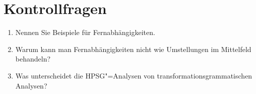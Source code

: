 \begin{comment}
Strukturen sind kohärent und vollständig, es gibt also nichts, was die unerwünschte Analyse in
(\mex{0}c) ausschließt. Die Konsequenz ist, daß man für die Konstituenten im Mittelfeld eine andere
\fstr"=Annotation braucht als für die im Vorfeld: Objekte im Vorfeld können zum obersten Verb(alkomplex) oder
aber zu tiefer eingebetteten Verben gehören, Objekte im Mittelfeld dagegen nur zu den Verben
im entsprechenden Kohärenzfeld (siehe Kapitel~\ref{chap-anhebung}). Das heißt aber, daß man an zwei verschiedenen
Stellen in der Grammatik sagen muß, daß (bestimmte) Nominative \subj sind, daß (bestimmte)
Akkusative \obj sind usw. 
%
%
Im Gegensatz zu der hier beschriebenen Theorie im Rahmen der LFG gibt es
in der HPSG keine grammatischen Funktionen. Eine Nominalphrase kann als Argument, als Adjunkt oder
prädikativ auf"|treten. Welche Funktion vorliegt, wird durch den Lexikoneintrag des Nomens
bestimmt. Fernabhängigkeiten interagieren mit der Funktion nicht, da die Vorfeldkonstituente mit einer
Spur identifiziert wird und somit alle relevante Information in beiden Teilstrukturen präsent ist:
Befindet sich im Vorfeld eine Akkusativ"=NP die Verbprojektionen modifiziert, so ist diese
Information auch bei der Spur präsent und wird im Mittelfeld in einer entsprechenden
Kopf"=Adjunkt"=Struktur mit dem Verb verknüpft. Parallel funktioniert das für Argumente bzw.\
prädikative Nominalphrasen.
\is{Lexical Functional Grammar@\emph{Lexical Functional Grammar} (LFG)|)}%
\end{comment}


\section*{Kontrollfragen}


\begin{enumerate}
\item Nennen Sie Beispiele für Fernabhängigkeiten.
\item Warum kann man Fernabhängigkeiten nicht wie Umstellungen im Mittelfeld behandeln?
\item Was unterscheidet die HPSG"=Analysen von transformationsgrammatischen Analysen?
\end{enumerate}

